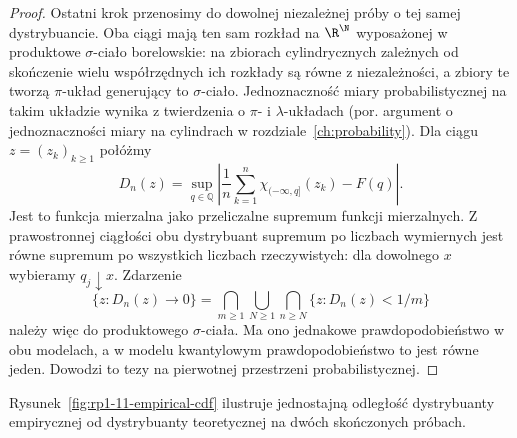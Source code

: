 \begin{proof}
Ostatni krok przenosimy do dowolnej niezależnej próby
o tej samej dystrybuancie. Oba ciągi mają ten sam
rozkład na $\R^{\N}$ wyposażonej w produktowe
$\sigma$-ciało borelowskie: na zbiorach cylindrycznych
zależnych od skończenie wielu współrzędnych ich
rozkłady są równe z niezależności, a zbiory te tworzą
$\pi$-układ generujący to $\sigma$-ciało. Jednoznaczność
miary probabilistycznej na takim układzie wynika
z twierdzenia o $\pi$- i $\lambda$-układach
(por. argument o jednoznaczności miary na cylindrach
w rozdziale~\ref{ch:probability}).
Dla ciągu $z=(z_k)_{k\geq1}$ połóżmy
\[
D_n(z)=\sup_{q\in\mathbb Q}
\left|\frac1n\sum_{k=1}^n\chi_{(-\infty,q]}(z_k)
-F(q)\right|.
\]
Jest to funkcja mierzalna jako przeliczalne supremum
funkcji mierzalnych. Z prawostronnej ciągłości obu
dystrybuant supremum po liczbach wymiernych jest
równe supremum po wszystkich liczbach rzeczywistych:
dla dowolnego $x$ wybieramy $q_j\downarrow x$.
Zdarzenie
\[
\{z:D_n(z)\to0\}
=\bigcap_{m\geq1}\bigcup_{N\geq1}
\bigcap_{n\geq N}\{z:D_n(z)<1/m\}
\]
należy więc do produktowego $\sigma$-ciała.
Ma ono jednakowe prawdopodobieństwo w obu modelach,
a w modelu kwantylowym prawdopodobieństwo to jest
równe jeden. Dowodzi to tezy na pierwotnej przestrzeni
probabilistycznej.
\end{proof}

Rysunek~\ref{fig:rp1-11-empirical-cdf} ilustruje
jednostajną odległość dystrybuanty empirycznej
od dystrybuanty teoretycznej na dwóch skończonych próbach.

